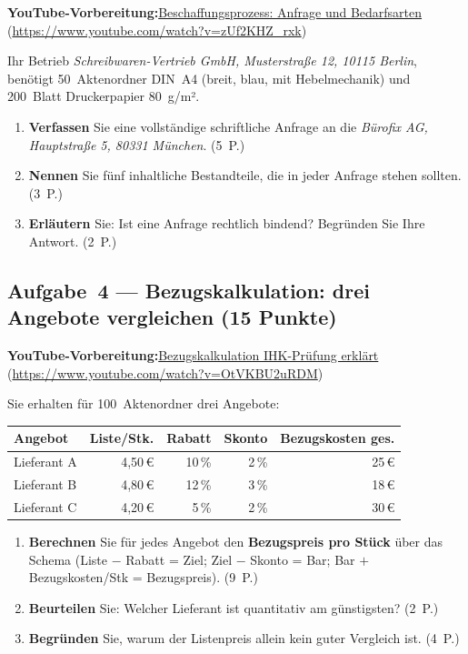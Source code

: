 \documentclass[11pt, a4paper]{article}
\begin{document}
\noindent\textbf{\color{bfwAccent}YouTube-Vorbereitung:}\enspace \href{https://www.youtube.com/watch?v=zUf2KHZ_rxk}{Beschaffungsprozess: Anfrage und Bedarfsarten} (\url{https://www.youtube.com/watch?v=zUf2KHZ_rxk})

\medskip
Ihr Betrieb \emph{Schreibwaren-Vertrieb GmbH, Musterstraße 12, 10115 Berlin}, benötigt
50~Aktenordner DIN~A4 (breit, blau, mit Hebelmechanik) und 200~Blatt Druckerpapier
80~g/m².

\begin{enumerate}[label=(\alph*)]
  \item \textbf{Verfassen} Sie eine vollständige schriftliche Anfrage an die \emph{Bürofix AG, Hauptstraße 5, 80331 München}. \hfill (5~P.)
  \item \textbf{Nennen} Sie fünf inhaltliche Bestandteile, die in jeder Anfrage stehen sollten. \hfill (3~P.)
  \item \textbf{Erläutern} Sie: Ist eine Anfrage rechtlich bindend? Begründen Sie Ihre Antwort. \hfill (2~P.)
\end{enumerate}

\subsection*{Aufgabe~4 --- Bezugskalkulation: drei Angebote vergleichen (15 Punkte)}

\noindent\textbf{\color{bfwAccent}YouTube-Vorbereitung:}\enspace \href{https://www.youtube.com/watch?v=OtVKBU2uRDM}{Bezugskalkulation IHK-Prüfung erklärt} (\url{https://www.youtube.com/watch?v=OtVKBU2uRDM})

\medskip
Sie erhalten für 100~Aktenordner drei Angebote:

\begin{center}
\begin{tabular}{lrrrr}
\toprule
\textbf{Angebot} & \textbf{Liste/Stk.} & \textbf{Rabatt} & \textbf{Skonto} & \textbf{Bezugskosten ges.}\\
\midrule
Lieferant A & 4{,}50\,€ & 10\,\% & 2\,\% & 25\,€\\
Lieferant B & 4{,}80\,€ & 12\,\% & 3\,\% & 18\,€\\
Lieferant C & 4{,}20\,€ & 5\,\% & 2\,\% & 30\,€\\
\bottomrule
\end{tabular}
\end{center}

\begin{enumerate}[label=(\alph*)]
  \item \textbf{Berechnen} Sie für jedes Angebot den \textbf{Bezugspreis pro Stück} über das Schema (Liste $-$ Rabatt = Ziel; Ziel $-$ Skonto = Bar; Bar $+$ Bezugskosten/Stk = Bezugspreis). \hfill (9~P.)
  \item \textbf{Beurteilen} Sie: Welcher Lieferant ist quantitativ am günstigsten? \hfill (2~P.)
  \item \textbf{Begründen} Sie, warum der Listenpreis allein kein guter Vergleich ist. \hfill (4~P.)
\end{enumerate}
\end{document}
